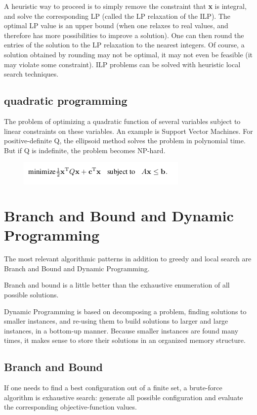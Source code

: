 \documentclass[11pt]{article}
\begin{document}
A heuristic way to proceed is to simply remove the constraint that \textbf{x} is integral, and solve the corresponding LP (called the LP relaxation of the ILP). The optimal LP value is an upper bound (when one relaxes to real values, and therefore has more possibilities to improve a solution). One can then round the entries of the solution to the LP relaxation to the nearest integers. Of course, a solution obtained
by rounding may not be optimal, it may not even be feasible (it may violate some constraint). ILP problems can be solved with heuristic local search techniques.

\subsection{quadratic programming}
The problem of optimizing a quadratic function of several variables subject to linear constraints on these variables. An example is Support Vector Machines.
For positive-definite Q, the ellipsoid method solves the problem in polynomial time. But if Q is indefinite, the problem
becomes NP-hard.

\begin{figure}[H]
\includegraphics[scale=0.60]{qp}
\centering
\end{figure}

\section{Branch and Bound and Dynamic Programming}
The most relevant algorithmic patterns in addition to greedy and local search are Branch and Bound and Dynamic Programming.

Branch and bound is a little better than the exhaustive enumeration of all possible solutions.

Dynamic Programming is based on decomposing a problem, finding solutions to smaller instances, and re-using them to build solutions to larger and large instances, in a bottom-up manner. Because smaller instances are found many times, it makes sense to store their solutions in an organized memory structure.

\subsection{Branch and Bound}
If one needs to find a best configuration out of a finite set, a brute-force algorithm is exhaustive search: generate all possible configuration and evaluate the corresponding objective-function values.
\end{document}
